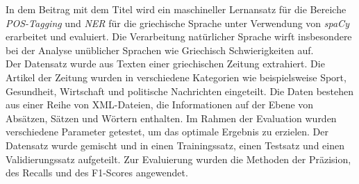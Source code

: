 In dem Beitrag mit dem Titel \cite{partalidou2019design} wird ein maschineller Lernansatz für die Bereiche \emph{POS-Tagging} und \emph{NER} für die griechische Sprache unter Verwendung von \emph{spaCy} erarbeitet und evaluiert. Die Verarbeitung natürlicher Sprache wirft insbesondere bei der Analyse unüblicher Sprachen wie Griechisch Schwierigkeiten auf.\\ Der Datensatz wurde aus Texten einer griechischen Zeitung extrahiert. Die Artikel der Zeitung wurden in verschiedene Kategorien wie beispielsweise Sport, Gesundheit, Wirtschaft und politische Nachrichten eingeteilt. Die Daten bestehen aus einer Reihe von XML-Dateien, die Informationen auf der Ebene von Absätzen, Sätzen und Wörtern enthalten. Im Rahmen der Evaluation wurden verschiedene Parameter getestet, um das optimale Ergebnis zu erzielen. Der Datensatz wurde gemischt und in einen Trainingssatz, einen Testsatz und einen Validierungssatz aufgeteilt. Zur Evaluierung wurden die Methoden der Präzision, des Recalls und des F1-Scores angewendet.




\newpage





